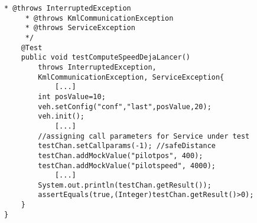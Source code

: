 \begin{lstlisting}[frame=single, caption={TestOnComputeSpeed.java},label=fig:JUnitTestOnComputeSpeed]
     * @throws InterruptedException
     * @throws KmlCommunicationException
     * @throws ServiceException
     */
    @Test
    public void testComputeSpeedDejaLancer() 
        throws InterruptedException, 
        KmlCommunicationException, ServiceException{	
            [...]
        int posValue=10;		
        veh.setConfig("conf","last",posValue,20);
        veh.init();		
            [...]
        //assigning call parameters for Service under test
        testChan.setCallparams(-1); //safeDistance
        testChan.addMockValue("pilotpos", 400);
        testChan.addMockValue("pilotspeed", 4000);	
            [...]
        System.out.println(testChan.getResult());
        assertEquals(true,(Integer)testChan.getResult()>0);
    }
}

\end{lstlisting}